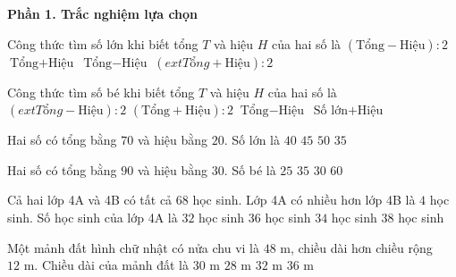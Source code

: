 \textbf{Phần 1. Trắc nghiệm lựa chọn}

\begin{ex} %
Công thức tìm số lớn khi biết tổng $T$ và hiệu $H$ của hai số là
\choice
{$(\text{Tổng} - \text{Hiệu}) : 2$}
{$\text{Tổng} + \text{Hiệu}$}
{$\text{Tổng} - \text{Hiệu}$}
{\True $(	ext{Tổng} + \text{Hiệu}) : 2$}
\end{ex}

\begin{ex} %
Công thức tìm số bé khi biết tổng $T$ và hiệu $H$ của hai số là
\choice
{\True $(	ext{Tổng} - \text{Hiệu}) : 2$}
{$(\text{Tổng} + \text{Hiệu}) : 2$}
{$\text{Tổng} - \text{Hiệu}$}
{$\text{Số lớn} + \text{Hiệu}$}
\end{ex}

\begin{ex} %
Hai số có tổng bằng $70$ và hiệu bằng $20$. Số lớn là
\choice
{$40$}
{\True $45$}
{$50$}
{$35$}
\end{ex}

\begin{ex} %
Hai số có tổng bằng $90$ và hiệu bằng $30$. Số bé là
\choice
{$25$}
{$35$}
{\True $30$}
{$60$}
\end{ex}

\begin{ex} %
Cả hai lớp 4A và 4B có tất cả $68$ học sinh. Lớp 4A có nhiều hơn lớp 4B là $4$ học sinh. Số học sinh của lớp 4A là
\choice
{$32$ học sinh}
{\True $36$ học sinh}
{$34$ học sinh}
{$38$ học sinh}
\end{ex}

\begin{ex} %
Một mảnh đất hình chữ nhật có nửa chu vi là $48\text{ m}$, chiều dài hơn chiều rộng $12\text{ m}$. Chiều dài của mảnh đất là
\choice
{\True $30\text{ m}$}
{$28\text{ m}$}
{$32\text{ m}$}
{$36\text{ m}$}
\end{ex}

